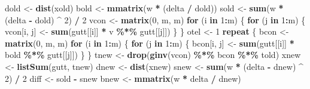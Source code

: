 \documentclass[
  12pt,
]{article}
\newenvironment{Shaded}{\begin{snugshade}}{\end{snugshade}}
\newcommand{\ControlFlowTok}[1]{\textcolor[rgb]{0.13,0.29,0.53}{\textbf{#1}}}
\newcommand{\DecValTok}[1]{\textcolor[rgb]{0.00,0.00,0.81}{#1}}
\newcommand{\FunctionTok}[1]{\textcolor[rgb]{0.13,0.29,0.53}{\textbf{#1}}}
\newcommand{\NormalTok}[1]{#1}
\newcommand{\OtherTok}[1]{\textcolor[rgb]{0.56,0.35,0.01}{#1}}
\newcommand{\SpecialCharTok}[1]{\textcolor[rgb]{0.81,0.36,0.00}{\textbf{#1}}}
\begin{document}
\begin{Shaded}
\begin{Highlighting}[]
\NormalTok{      dold }\OtherTok{\textless{}{-}} \FunctionTok{dist}\NormalTok{(xold)}
\NormalTok{      bold }\OtherTok{\textless{}{-}} \FunctionTok{mmatrix}\NormalTok{(w }\SpecialCharTok{*}\NormalTok{ (delta }\SpecialCharTok{/}\NormalTok{ dold))}
\NormalTok{      sold }\OtherTok{\textless{}{-}} \FunctionTok{sum}\NormalTok{(w }\SpecialCharTok{*}\NormalTok{ (delta }\SpecialCharTok{{-}}\NormalTok{ dold) }\SpecialCharTok{\^{}} \DecValTok{2}\NormalTok{) }\SpecialCharTok{/} \DecValTok{2}
\NormalTok{      vcon }\OtherTok{\textless{}{-}} \FunctionTok{matrix}\NormalTok{(}\DecValTok{0}\NormalTok{, m, m)}
      \ControlFlowTok{for}\NormalTok{ (i }\ControlFlowTok{in} \DecValTok{1}\SpecialCharTok{:}\NormalTok{m) \{}
        \ControlFlowTok{for}\NormalTok{ (j }\ControlFlowTok{in} \DecValTok{1}\SpecialCharTok{:}\NormalTok{m) \{}
\NormalTok{          vcon[i, j] }\OtherTok{\textless{}{-}} \FunctionTok{sum}\NormalTok{(gutt[[i]] }\SpecialCharTok{*}\NormalTok{ v }\SpecialCharTok{\%*\%}\NormalTok{ gutt[[j]])}
\NormalTok{        \}}
\NormalTok{      \}}
\NormalTok{      otel }\OtherTok{\textless{}{-}} \DecValTok{1}
      \ControlFlowTok{repeat}\NormalTok{ \{}
\NormalTok{        bcon }\OtherTok{\textless{}{-}} \FunctionTok{matrix}\NormalTok{(}\DecValTok{0}\NormalTok{, m, m)}
        \ControlFlowTok{for}\NormalTok{ (i }\ControlFlowTok{in} \DecValTok{1}\SpecialCharTok{:}\NormalTok{m) \{}
          \ControlFlowTok{for}\NormalTok{ (j }\ControlFlowTok{in} \DecValTok{1}\SpecialCharTok{:}\NormalTok{m) \{}
\NormalTok{            bcon[i, j] }\OtherTok{\textless{}{-}} \FunctionTok{sum}\NormalTok{(gutt[[i]] }\SpecialCharTok{*}\NormalTok{ bold }\SpecialCharTok{\%*\%}\NormalTok{ gutt[[j]])}
\NormalTok{          \}}
\NormalTok{        \}}
\NormalTok{        tnew }\OtherTok{\textless{}{-}} \FunctionTok{drop}\NormalTok{(}\FunctionTok{ginv}\NormalTok{(vcon) }\SpecialCharTok{\%*\%}\NormalTok{ bcon }\SpecialCharTok{\%*\%}\NormalTok{ told)}
\NormalTok{        xnew }\OtherTok{\textless{}{-}} \FunctionTok{listSum}\NormalTok{(gutt, tnew)}
\NormalTok{        dnew }\OtherTok{\textless{}{-}} \FunctionTok{dist}\NormalTok{(xnew)}
\NormalTok{        snew }\OtherTok{\textless{}{-}} \FunctionTok{sum}\NormalTok{(w }\SpecialCharTok{*}\NormalTok{ (delta }\SpecialCharTok{{-}}\NormalTok{ dnew) }\SpecialCharTok{\^{}} \DecValTok{2}\NormalTok{) }\SpecialCharTok{/} \DecValTok{2}
\NormalTok{        diff }\OtherTok{\textless{}{-}}\NormalTok{ sold }\SpecialCharTok{{-}}\NormalTok{ snew}
\NormalTok{        bnew }\OtherTok{\textless{}{-}} \FunctionTok{mmatrix}\NormalTok{(w }\SpecialCharTok{*}\NormalTok{ delta }\SpecialCharTok{/}\NormalTok{ dnew)}

\end{Highlighting}
\end{Shaded}
\end{document}
